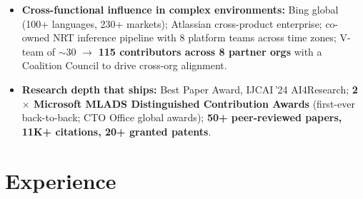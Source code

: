 \documentclass[10.5pt,letterpaper]{article}
\begin{document}
\begin{itemize}
  \item \textbf{Cross-functional influence in complex environments:} Bing global (100+ languages, 230+ markets); Atlassian cross-product enterprise; co-owned NRT inference pipeline with 8 platform teams across time zones; V-team of $\sim$30 $\to$ \textbf{115 contributors across 8 partner orgs} with a Coalition Council to drive cross-org alignment.
  \item \textbf{Research depth that ships:} Best Paper Award, IJCAI\,'24 AI4Research; \textbf{2$\times$ Microsoft MLADS Distinguished Contribution Awards} (first-ever back-to-back; CTO Office global awards); \textbf{50+ peer-reviewed papers, 11K+ citations, 20+ granted patents}.
\end{itemize}

\section*{Experience}
\end{document}

